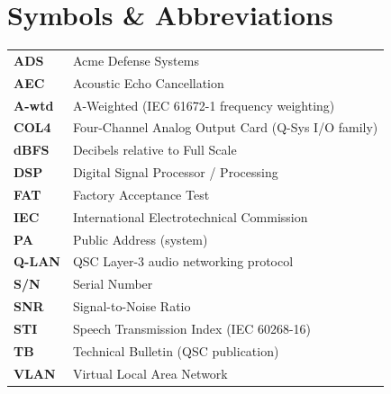 \section{Symbols \& Abbreviations}

\vspace{2pt}
{\renewcommand{\arraystretch}{1.25}
\begin{tabularx}{\linewidth}{@{}>{\color{accent}\bfseries}l@{\hspace{8mm}}>{\raggedright\arraybackslash}X@{}}
ADS       & Acme Defense Systems \\
AEC       & Acoustic Echo Cancellation \\
A-wtd     & A-Weighted (IEC 61672-1 frequency weighting) \\
COL4      & Four-Channel Analog Output Card (Q-Sys I/O family) \\
dBFS      & Decibels relative to Full Scale \\
DSP       & Digital Signal Processor / Processing \\
FAT       & Factory Acceptance Test \\
IEC       & International Electrotechnical Commission \\
PA        & Public Address (system) \\
Q-LAN     & QSC Layer-3 audio networking protocol \\
S/N       & Serial Number \\
SNR       & Signal-to-Noise Ratio \\
STI       & Speech Transmission Index (IEC 60268-16) \\
TB        & Technical Bulletin (QSC publication) \\
VLAN      & Virtual Local Area Network \\
\end{tabularx}
}

